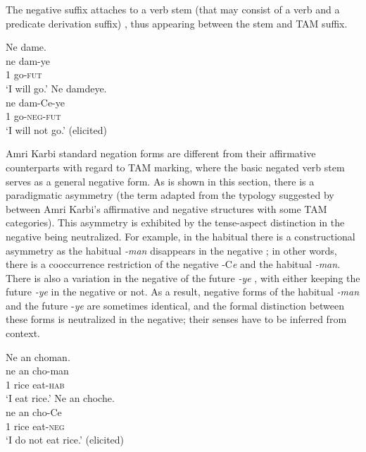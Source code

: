 \documentclass[output=paper,colorlinks,citecolor=brown]{langscibook}
\begin{document}
The negative suffix attaches to a verb stem (that may consist of a verb and a predicate derivation suffix) , thus appearing between the stem and TAM suffix.

\ea\label{ex:amr:1}
    \ea\label{ex:amr:1a} Ne dame.  \\ 
        \gll 
              ne dam-ye \\
              1 go-\textsc{fut}\\
        \glt ‘I will go.’
    \ex\label{ex:amr:1b}Ne damdeye. \\
        \gll ne dam-Ce-ye \\
              1 go-\textsc{neg}{}-\textsc{fut}\\
        \glt ‘I will not go.’ (elicited)
    \z 
\z

Amri Karbi standard negation forms are different from their affirmative counterparts with regard to TAM marking, where the basic negated verb stem serves as a general negative form. As is shown in this section, there is a paradigmatic asymmetry (the term adapted from the typology suggested by \citealt{Miestamo2005} between Amri Karbi’s affirmative and negative structures with some TAM categories). This asymmetry is exhibited by the tense-aspect distinction in the negative being neutralized. For example, in the habitual there is a constructional asymmetry as the habitual \textit{{}-man} disappears in the negative ; in other words, there is a cooccurrence restriction of the negative -C\textit{e} and the habitual \textit{{}-man}. There is also a variation in the negative of the future \textit{{}-ye} , with either keeping the future \textit{{}-ye} in the negative or not. As a result, negative forms of the habitual \textit{{}-man} and the future -\textit{ye} are sometimes identical, and the formal distinction between these forms is neutralized in the negative; their senses have to be inferred from context. 

\ea\label{ex:amr:2} 
    \ea\label{ex:amr:2a}Ne an choman.  \\ 
        \gll ne an cho-man \\
              1 rice eat-\textsc{hab} \\
        \glt  ‘I eat rice.’ 
    \ex\label{ex:amr:2b}Ne an choche. \\
        \gll ne an cho-Ce\\
             1 rice eat-\textsc{neg} \\
        \glt ‘I do not eat rice.’ (elicited)
    \z
\z 
\end{document}
